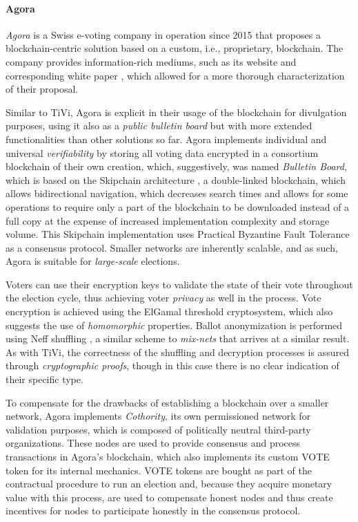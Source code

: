\documentclass[../access.tex]{subfiles}
\begin{document}
\paragraph{Agora \cite{Agora2021}}
\textit{Agora} is a Swiss e-voting company in operation since 2015 that proposes a blockchain-centric solution based on a custom, i.e., proprietary, blockchain. The company provides information-rich mediums, such as its website \cite{Agora2021} and corresponding white paper \cite{AgoraWhitePaper2021}, which allowed for a more thorough characterization of their proposal.
\par
Similar to TiVi, Agora is explicit in their usage of the blockchain for divulgation purposes, using it also as a \textit{public bulletin board} but with more extended functionalities than other solutions so far. Agora implements individual and universal \textit{verifiability} by storing all voting data encrypted in a consortium blockchain of their own creation, which, suggestively, was named \textit{Bulletin Board}, which is based on the Skipchain architecture \cite{Nikitin2017}, a double-linked blockchain, which allows bidirectional navigation, which decreases search times and allows for some operations to require only a part of the blockchain to be downloaded instead of a full copy at the expense of increased implementation complexity and storage volume. This Skipchain implementation uses Practical Byzantine Fault Tolerance as a consensus protocol. Smaller networks are inherently scalable, and as such, Agora is suitable for \textit{large-scale} elections.
\par
Voters can use their encryption keys to validate the state of their vote throughout the election cycle, thus achieving voter \textit{privacy} as well in the process. Vote encryption is achieved using the ElGamal threshold cryptosystem, which also suggests the use of \textit{homomorphic} properties. Ballot anonymization is performed using Neff shuffling \cite{Neff2001}, a similar scheme to \textit{mix-nets} that arrives at a similar result. As with TiVi, the correctness of the shuffling and decryption processes is assured through \textit{cryptographic proofs}, though in this case there is no clear indication of their specific type.
\par
To compensate for the drawbacks of establishing a blockchain over a smaller network, Agora implements \textit{Cothority}, its own permissioned network for validation purposes, which is composed of politically neutral third-party organizations. These nodes are used to provide consensus and process transactions in Agora's blockchain, which also implements its custom VOTE token for its internal mechanics. VOTE tokens are bought as part of the contractual procedure to run an election and, because they acquire monetary value with this process, are used to compensate honest nodes and thus create incentives for nodes to participate honestly in the consensus protocol.
\end{document}
